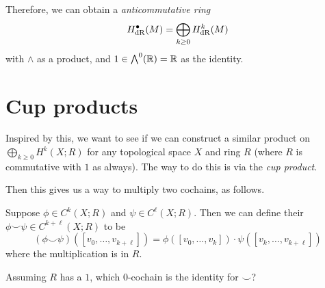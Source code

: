 Therefore, we can obtain a \emph{anticommutative ring}
\[ H_{\mathrm{dR}}^\bullet(M) = \bigoplus_{k \ge 0} H_{\mathrm{dR}}^k(M) \]
with $\wedge$ as a product, and $1 \in \bigwedge^0(\mathbb R) = \mathbb R$ as the identity.

\section{Cup products}
Inspired by this, we want to see if we can construct a similar product
on $\bigoplus_{k \ge 0} H^k(X; R)$ for any topological space $X$ and ring $R$
(where $R$ is commutative with $1$ as always).
The way to do this is via the \emph{cup product}.

Then this gives us a way to multiply two cochains, as follows.
\begin{definition}
	Suppose $\phi \in C^k(X;R)$ and $\psi \in C^\ell(X;R)$.
	Then we can define their 
	$\phi\smile\psi \in C^{k+\ell}(X;R)$ to be
	\[
		(\phi\smile\psi)([v_0, \dots, v_{k+\ell}])
		=
		\phi\left( [v_0, \dots, v_k] \right)
		\cdot
		\psi\left( [v_k, \dots, v_{k+\ell}] \right)
	\]
	where the multiplication is in $R$.
\end{definition}

\begin{ques}
	Assuming $R$ has a $1$, which $0$-cochain is the identity for $\smile$?
\end{ques}

